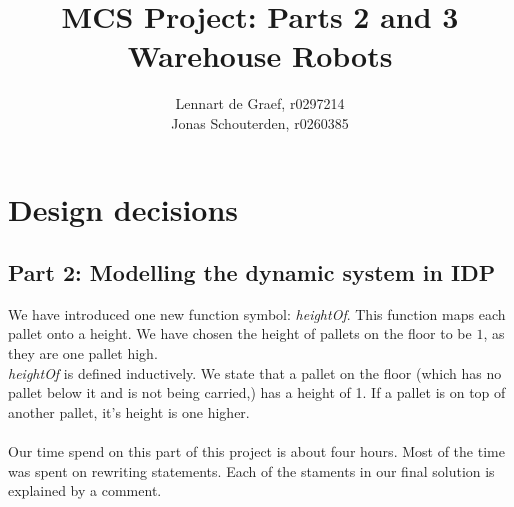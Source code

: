 \documentclass[10pt,a4paper]{article}
\begin{document}
\author{Lennart de Graef, r0297214\\Jonas Schouterden, r0260385}
\title{MCS Project: Parts 2 and 3 \\
Warehouse Robots}
\maketitle

\section*{Design decisions}
\subsection*{Part 2: Modelling the dynamic system in IDP}
We have introduced one new function symbol: \emph{heightOf}. This function maps each pallet onto a height. We have chosen the height of pallets on the floor to be $1$, as they are one pallet high.
\\
\emph{heightOf} is defined inductively. We state that a pallet on the floor (which has no pallet below it and is not being carried,) has a height of 1.
If a pallet is on top of another pallet, it's height is one higher.\\
\\
Our time spend on this part of this project is about four hours. Most of the time was spent on rewriting statements. Each of the staments in our final solution is explained by a comment. 
\end{document}
